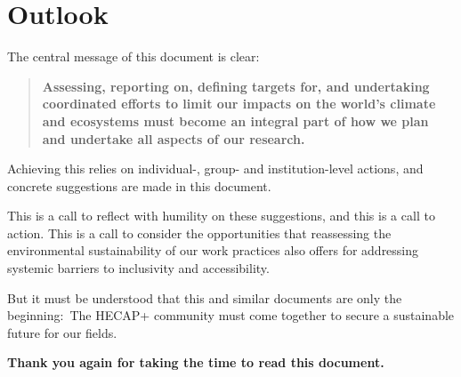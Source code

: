 \documentclass[../SustainableHEP.tex]{subfiles}
\begin{document}
\RaggedRight
\sloppy
\newpage


\section{Outlook}
\label{sec:Outlook}

The central message of this document is clear:
\begin{quotation}
{\bfseries Assessing, reporting on, defining targets for, and undertaking coordinated efforts to limit our impacts on the world's climate and ecosystems must become an integral part of how we plan and undertake all aspects of our research.}
\end{quotation}
Achieving this relies on individual-, group- and institution-level actions, and concrete suggestions are made in this document.

This is a call to reflect with humility on these suggestions, and this is a call to action. This is a call to consider the opportunities that reassessing the environmental sustainability of our work practices also offers for addressing systemic barriers to inclusivity and accessibility.

But it must be understood that this and similar documents are only the beginning:\ The HECAP+ community must come together to secure a sustainable future for our fields.

\noindent \textbf{Thank you again for taking the time to read this document.}
\end{document}
